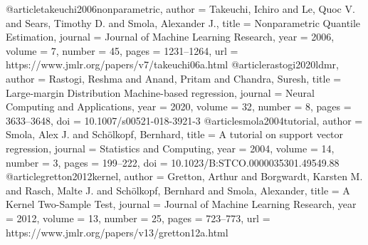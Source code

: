 @article{takeuchi2006nonparametric,
  author = {Takeuchi, Ichiro and Le, Quoc V. and Sears, Timothy D. and Smola, Alexander J.},
  title = {Nonparametric Quantile Estimation},
  journal = {Journal of Machine Learning Research},
  year = {2006}, volume = {7}, number = {45}, pages = {1231--1264},
  url = {https://www.jmlr.org/papers/v7/takeuchi06a.html}
}
@article{rastogi2020ldmr,
  author = {Rastogi, Reshma and Anand, Pritam and Chandra, Suresh},
  title = {Large-margin Distribution Machine-based regression},
  journal = {Neural Computing and Applications},
  year = {2020}, volume = {32}, number = {8}, pages = {3633--3648},
  doi = {10.1007/s00521-018-3921-3}
}
@article{smola2004tutorial,
  author = {Smola, Alex J. and Sch{\"o}lkopf, Bernhard},
  title = {A tutorial on support vector regression},
  journal = {Statistics and Computing},
  year = {2004}, volume = {14}, number = {3}, pages = {199--222},
  doi = {10.1023/B:STCO.0000035301.49549.88}
}
@article{gretton2012kernel,
  author = {Gretton, Arthur and Borgwardt, Karsten M. and Rasch, Malte J. and Sch{\"o}lkopf, Bernhard and Smola, Alexander},
  title = {A Kernel Two-Sample Test},
  journal = {Journal of Machine Learning Research},
  year = {2012}, volume = {13}, number = {25}, pages = {723--773},
  url = {https://www.jmlr.org/papers/v13/gretton12a.html}
}
